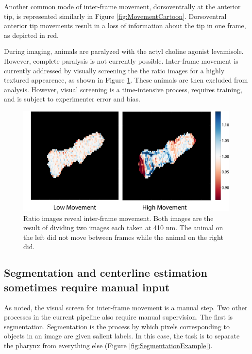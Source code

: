 Another common mode of inter-frame movement, dorsoventrally at the anterior tip, is represented similarly in Figure \ref{fig:MovementCartoon}. Dorsoventral anterior tip movements result in a loss of information about the tip in one frame, as depicted in red.

During imaging, animals are paralyzed with the actyl choline agonist levamisole. However, complete paralysis is not currently possible. Inter-frame movement is currently addressed by visually screening the the ratio images for a highly textured appearence, as shown in Figure \ref{fig:HighMovement}. These animals are then excluded from analysis. However, visual screening is a time-intensive process, requires training, and is subject to experimenter error and bias.

\begin{figure}[ht]
    \centering
    \includegraphics[scale=0.3]{Figures/rendered_files/low_high_movement}
    \decoRule
    \caption[A ratio image reveals inter-frame movement]{Ratio images reveal inter-frame movement. Both images are the result of dividing two images each taken at 410 nm. The animal on the left did not move between frames while the animal on the right did.}
    \label{fig:HighMovement}
\end{figure}

\subsection{Segmentation and centerline estimation sometimes require manual input} \label{limitationManual}

As noted, the visual screen for inter-frame movement is a manual step. Two other processes in the current pipeline also require manual supervision. The first is segmentation. Segmentation is the process by which pixels corresponding to objects in an image are given salient labels. In this case, the task is to separate the pharynx from everything else (Figure \ref{fig:SegmentationExample}). 

